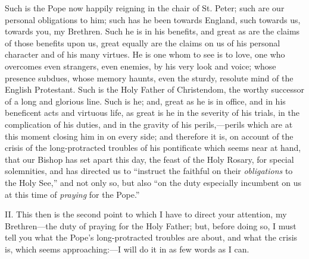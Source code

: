 Such is the Pope now happily reigning in the chair of
St. Peter; such are our personal obligations to him; such
has he been towards England, such towards us, towards
you, my Brethren. Such he is in his benefits, and great
as are the claims of those benefits upon us, great
equally are the claims on us of his personal character
and of his many virtues. He is one whom to see is to
love, one who overcomes even strangers, even enemies, by
his very look and voice; whose presence subdues, whose
memory haunts, even the sturdy, resolute mind of the
English Protestant. Such is the Holy Father of
Christendom, the worthy successor of a long and glorious
line. Such is he; and, great as he is in office, and in
his beneficent acts and virtuous life, as great is he in
the severity of his trials, in the complication of his
duties, and in the gravity of his perils,—perils
which are at this moment closing him in on every side;
and therefore it is, on account of the crisis of the
long-protracted troubles of his pontificate which seems
near at hand, that our Bishop has set apart this day, the
feast of the Holy Rosary, for special solemnities, and
has directed us to ``instruct the faithful on their \emph{obligations}
to the Holy See,'' and not only so, but also ``on
the duty especially incumbent on us at this time of \emph{praying}
for the Pope.''

II. This then is the second point to which I have to
direct your attention, my Brethren—the duty of
praying for the Holy Father; but, before doing so, I must
tell you what the Pope's long-protracted troubles are
about, and what the crisis is, which seems
approaching:—I will do it in as few words as I can.


